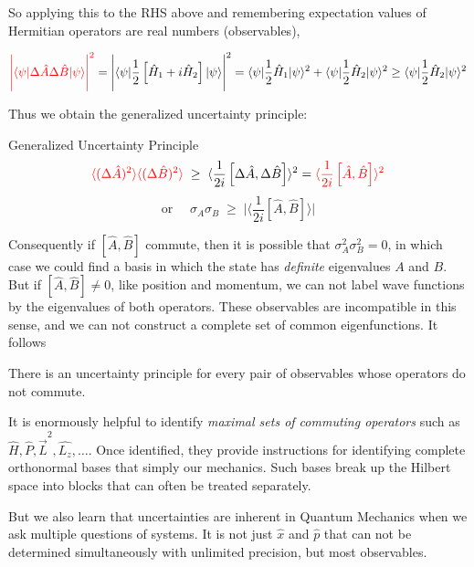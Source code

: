 So applying this to the RHS above and remembering expectation values of
Hermitian operators are real numbers (observables), 

\[
  \textcolor{red}{\Bigg| \langle \psi | \Delta \hat{A} \Delta \hat{B} | \psi
  \rangle \Bigg|^2 } = \Bigg| \langle \psi | \frac{1}{2} \left[ \hat{H}_1
  + i \hat{H}_2 \right] |\psi\rangle \Bigg|^2 = \langle \psi | \frac{1}{2}
  \hat{H}_1 | \psi \rangle^2 + \langle \psi | \frac{1}{2} \hat{H}_2
  |\psi\rangle ^2 \geq \langle \psi | \frac{1}{2} \hat{H}_2 |\psi\rangle^2
\] \vspace{3px}

Thus we obtain the generalized uncertainty principle: 

\begin{subbox}{Generalized Uncertainty Principle}
  \[ \textcolor{red}{\langle (\Delta \hat{A})^2 \rangle \langle (\Delta
    \hat{B})^2 \rangle}\; \geq\;
    \langle \frac{1}{2i} \left[ \Delta \hat{A}, \Delta \hat{B}\right] \rangle^2
    = \textcolor{red}{\langle \frac{1}{2i} \left[\hat{A}, \hat{B}\right]
  \rangle^2} \]
    \[ \text{or } \quad \sigma_A\sigma_B \; \geq\; \Bigg| \langle \frac{1}{2i} \left[ \hat{A},
    \hat{B} \right] \rangle \Bigg| \] 
\end{subbox}


Consequently if $\left[ \hat{A}, \hat{B}\right]$ commute, then it is possible
that $\sigma_A^2 \sigma_B^2 = 0$, in which case we could find a basis in which
the state has \textit{definite} eigenvalues $A$ and $B$. But if $\left[\hat{A},
\hat{B}\right] \neq 0 $, like position and momentum, we can not label wave
functions by the eigenvalues of both operators. These observables are
incompatible in this sense, and we can not construct a complete set of common
eigenfunctions. It follows 

\begin{mainbox}{}
  There is an uncertainty principle for every pair of observables whose
  operators do not commute.
\end{mainbox}


It is enormously helpful to identify \textit{maximal sets of commuting
operators} such as $\hat{H}, \hat{P}, \hat{\vec{L}}^2, \hat{L_z}, \hdots$. Once
identified, they provide instructions for identifying complete orthonormal
bases that simply our mechanics. Such bases break up the Hilbert space
into blocks that can often be treated separately. 

But we also learn that uncertainties are inherent in Quantum Mechanics when we
ask multiple questions of systems. It is not just $\hat{x}$ and $\hat{p}$ that
can not be determined simultaneously with unlimited precision, but most
observables. 
























